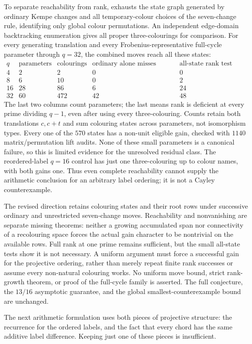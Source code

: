 \documentclass[11pt,a4paper]{article}
\theoremstyle{definition}
\theoremstyle{remark}
\begin{document}
To separate reachability from rank,  exhausts the state graph generated by ordinary Kempe changes and all temporary-colour choices of the seven-change rule, identifying only global colour permutations.  An independent edge-domain backtracking enumeration gives all proper three-colourings for comparison.  For every generating translation and every Frobenius-representative full-cycle parameter through $q=32$, the combined moves reach all these states:
\[
\begin{array}{r|r|r|r|r}
q&\text{parameters}&\text{colourings}&\text{ordinary alone misses states}
 &\text{all-state rank test fails}\\\hline
4&2&2&0&0\\
8&6&10&0&2\\
16&28&86&6&24\\
32&60&472&42&48
\end{array}
\]
The last two columns count parameters; the last means rank is deficient at every prime dividing $q-1$, even after using every three-colouring.  Counts retain both translations $c,c+t$ and sum colouring states across parameters, not isomorphism types.  Every one of the $570$ states has a non-unit eligible gain, checked with $1140$ matrix/permutation lift audits.  None of these small parameters is a canonical failure, so this is limited evidence for the unresolved residual class.  The reordered-label $q=16$ control has just one three-colouring up to colour names, with both gains one.  Thus even complete reachability cannot supply the arithmetic conclusion for an arbitrary label ordering; it is not a Cayley counterexample.

The revised direction retains colouring states and their root rows under successive ordinary and unrestricted seven-change moves.  Reachability and nonvanishing are separate missing theorems: neither a growing accumulated span nor connectivity of a recolouring space forces the actual gain character to be nontrivial on the available rows.  Full rank at one prime remains sufficient, but the small all-state tests show it is not necessary.  A uniform argument must force a successful gain for the projective ordering, rather than merely repeat finite rank successes or assume every non-natural colouring works.  No uniform move bound, strict rank-growth theorem, or proof of the full-cycle family is asserted.  The full conjecture, the $13/16$ asymptotic guarantee, and the global smallest-counterexample bound are unchanged.

The next arithmetic formulation uses both pieces of projective structure: the recurrence for the ordered labels, and the fact that every chord has the same additive label difference.  Keeping just one of these pieces is insufficient.
\end{document}
